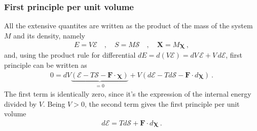 \documentclass[letterpaper,10pt,english]{jupyterBook}
\begin{document}
\subsubsection{First principle per unit volume}
\label{\detokenize{ch/potentials:first-principle-per-unit-volume}}
\sphinxAtStartPar
All the extensive quantites are written as the product of the mass of the system \(M\) and its density, namely
\begin{equation*}
\begin{split}E = V  \mathcal{E} \quad , \quad S = M  \mathcal{S} \quad , \quad \mathbf{X} = M \symbf{\chi} \ ,\end{split}
\end{equation*}
\sphinxAtStartPar
and, using the product rule for differential \(d E = d (V \mathcal{E}) = dV \, \mathcal{E} + V \, d\mathcal{E}\), first principle can be written as
\begin{equation*}
\begin{split}0 = d V \underbrace{\left( \mathcal{E} - T \mathcal{S} - \mathbf{F} \cdot \symbf{\chi} \right)}_{= 0} + V \left( d \mathcal{E} - T d \mathcal{S} - \mathbf{F} \cdot d \symbf{\chi} \right) \ .\end{split}
\end{equation*}
\sphinxAtStartPar
The first term is identically zero, since it’s the expression of the internal energy divided by \(V\). Being \(V > 0\), the second term gives the first principle per unit volume
\begin{equation*}
\begin{split}d \mathcal{E} = T d\mathcal{S} + \mathbf{F} \cdot d \symbf{\chi} \ .\end{split}
\end{equation*}
\end{document}
